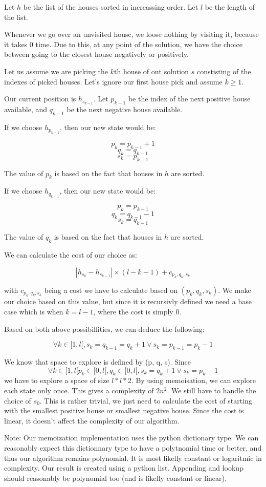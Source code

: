 \documentclass[11pt, a4paper]{article}
\begin{document}
Let $h$ be the list of the houses sorted in increassing order.
Let $l$ be the length of the list.

Whenever we go over an unvisited house, we loose nothing by visiting it, because it takes 0 time.
Due to this, at any point of the solution, we have the choice between going to the closest house negatively or positively.

Let us assume we are picking the $k$th house of out solution $s$ constisting of the indexes of picked houses.
Let's ignore our first house pick and assume $k \geq 1$.

Our current position is $h_{s_{k-1}}$.
Let $p_{k - 1}$ be the index of the next positive house available, and $q_{k - 1}$ be the next negative house available.


If we choose $h_{p_{k - 1}}$, then our new state would be:

\[p_k = p_{k - 1} + 1\]
\[q_k = q_{k - 1}\]
\[s_k = p_{k - 1}\]

The value of $p_k$ is based on the fact that houses in $h$ are sorted.

If we choose $h_{q_{k - 1}}$, then our new state would be:

\[p_k = p_{k - 1}\]
\[q_k = q_{k - 1} - 1\]
\[s_k = q_{k - 1}\]

The value of $q_k$ is based on the fact that houses in $h$ are sorted.


We can calculate the cost of our choice as:

\[|h_{s_{k}} - h_{s_{k - 1}}| \times (l - k - 1) + c_{p_k, q_k, s_k}\]

with $c_{p_k, q_k, s_k}$ being a cost we have to calculate based on $(p_k, q_k, s_k)$. We make our choice based on this value, but since it is recursivly defined we need a base case which is when $k = l - 1$, where the cost is simply $0$.

Based on both above possibillities, we can deduce the following:

\[\forall k \in [1, l[, s_k = q_{k - 1} = q_k + 1 \vee s_k = p_{k - 1} = p_k - 1\]

We know that space to explore is defined by (p, q, s).
Since \[\forall k \in [1, l[ p_k \in [0, l[, q_k \in [0, l[, s_k = q_k + 1 \vee s_k = p_k - 1\] we have to explore a space of size $l * l * 2$.
By using memoisation, we can explore each state only once.
This gives a complexity of $2n^2$.
We still have to handle the choice of $s_0$.
This is rather trivial, we just need to calculate the cost of starting with the smallest positive house or smallest negative house.
Since the cost is linear, it doesn't affect the complexity of our algorithm.


Note: Our memoization implementation uses the python dictionary type. We can reasonably expect this dictionnary type to have a polytnomial time or better, and thus our algorithm remains polynomial. It is most likelly constant or logaritmic in complexity. Our result is created using a python list. Appending and lookup should reasonably be polynomial too (and is likelly constant or linear).
\end{document}
